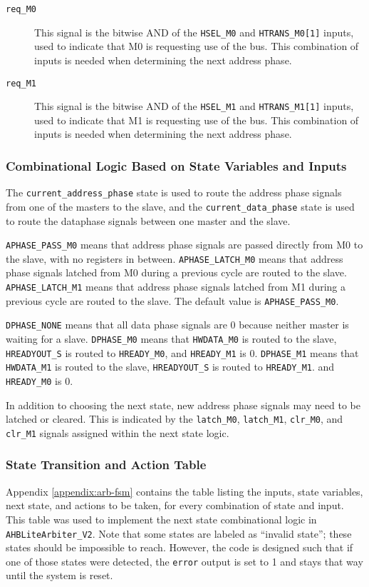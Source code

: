 \begin{description}
	\item[\texttt{req\_M0}] This signal is the bitwise AND of the \texttt{HSEL\_M0} and \texttt{HTRANS\_M0[1]} inputs, used to indicate that M0 is requesting use of the bus. This combination of inputs is needed when determining the next address phase.
	\item[\texttt{req\_M1}] This signal is the bitwise AND of the \texttt{HSEL\_M1} and \texttt{HTRANS\_M1[1]} inputs, used to indicate that M1 is requesting use of the bus. This combination of inputs is needed when determining the next address phase.
\end{description}

\subsubsection{Combinational Logic Based on State Variables and Inputs}
The \texttt{current\_address\_phase} state is used to route the address phase signals from one of the masters to the slave, and the \texttt{current\_data\_phase} state is used to route the dataphase signals between one master and the slave. 

\texttt{APHASE\_PASS\_M0} means that address phase signals are passed directly from M0 to the slave, with no registers in between. \texttt{APHASE\_LATCH\_M0} means that address phase signals latched from M0 during a previous cycle are routed to the slave. \texttt{APHASE\_LATCH\_M1} means that address phase signals latched from M1 during a previous cycle are routed to the slave. The default value is \texttt{APHASE\_PASS\_M0}.

\texttt{DPHASE\_NONE} means that all data phase signals are 0 because neither master is waiting for a slave. \texttt{DPHASE\_M0} means that \texttt{HWDATA\_M0} is routed to the slave, \texttt{HREADYOUT\_S} is routed to \texttt{HREADY\_M0}, and \texttt{HREADY\_M1} is 0. \texttt{DPHASE\_M1} means that \texttt{HWDATA\_M1} is routed to the slave, \texttt{HREADYOUT\_S} is routed to \texttt{HREADY\_M1}. and \texttt{HREADY\_M0} is 0.

In addition to choosing the next state, new address phase signals may need to be latched or cleared. This is indicated by the \texttt{latch\_M0}, \texttt{latch\_M1}, \texttt{clr\_M0}, and \texttt{clr\_M1} signals assigned within the next state logic. %

\subsubsection{State Transition and Action Table}
Appendix \ref{appendix:arb-fsm} contains the table listing the inputs, state variables, next state, and actions to be taken, for every combination of state and input. This table was used to implement the next state combinational logic in \texttt{AHBLiteArbiter\_V2}. Note that some states are labeled as ``invalid state''; these states should be impossible to reach. However, the code is designed such that if one of those states were detected, the \texttt{error} output is set to 1 and stays that way until the system is reset. %

